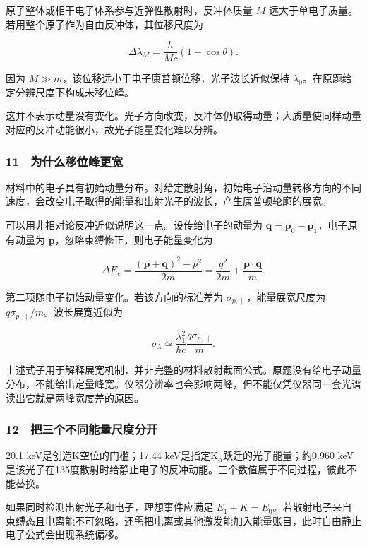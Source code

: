 \documentclass[12pt,a4paper,fontset=fandol]{ctexart}
\begin{document}
原子整体或相干电子体系参与近弹性散射时，反冲体质量 \(M\)
远大于单电子质量。若用整个原子作为自由反冲体，其位移尺度为

\[\Delta\lambda_M=\frac h{Mc}(1-\cos\theta).\]

因为 \(M\gg m\)，该位移远小于电子康普顿位移，光子波长近似保持
\(\lambda_0\)。在原题给定分辨尺度下构成未移位峰。

这并不表示动量没有变化。光子方向改变，反冲体仍取得动量；大质量使同样动量对应的反冲动能很小，故光子能量变化难以分辨。

\subsubsection{11　为什么移位峰更宽}\label{ux4e3aux4ec0ux4e48ux79fbux4f4dux5cf0ux66f4ux5bbd}

材料中的电子具有初始动量分布。对给定散射角，初始电子沿动量转移方向的不同速度，会改变电子取得的能量和出射光子的波长，产生康普顿轮廓的展宽。

可以用非相对论反冲近似说明这一点。设传给电子的动量为
\(\boldsymbol q=\boldsymbol p_0-\boldsymbol p_1\)，电子原有动量为
\(\boldsymbol p\)，忽略束缚修正，则电子能量变化为

\[\Delta E_e=\frac{(\boldsymbol p+\boldsymbol q)^2-p^2}{2m}
=\frac{q^2}{2m}+\frac{\boldsymbol p\cdot\boldsymbol q}{m}.\]

第二项随电子初始动量变化。若该方向的标准差为
\(\sigma_{p,\parallel}\)，能量展宽尺度为
\(q\sigma_{p,\parallel}/m\)。波长展宽近似为

\[\sigma_\lambda\simeq\frac{\lambda_1^2}{hc}
\frac{q\sigma_{p,\parallel}}m.\]

上述式子用于解释展宽机制，并非完整的材料散射截面公式。原题没有给电子动量分布，不能给出定量峰宽。仪器分辨率也会影响两峰，但不能仅凭仪器同一套光谱读出它就是两峰宽度差的原因。

\subsubsection{12　把三个不同能量尺度分开}\label{ux628aux4e09ux4e2aux4e0dux540cux80fdux91cfux5c3aux5ea6ux5206ux5f00}

20.1 keV是创造K空位的门槛；17.44
keV是指定K\(_\alpha\)跃迁的光子能量；约0.960
keV是该光子在135度散射时给静止电子的反冲动能。三个数值属于不同过程，彼此不能替换。

如果同时检测出射光子和电子，理想事件应满足
\(E_1+K=E_0\)。若散射电子来自束缚态且电离能不可忽略，还需把电离或其他激发能加入能量账目，此时自由静止电子公式会出现系统偏移。
\end{document}
